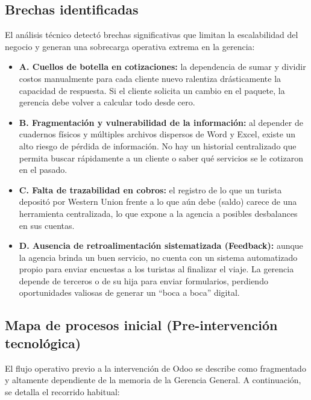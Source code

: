 \subsection{Brechas identificadas}
\begin{indentedsubsection}
El análisis técnico detectó brechas significativas que limitan la escalabilidad del negocio y generan una sobrecarga operativa extrema en la gerencia:

\begin{itemize}
    \item \textbf{A. Cuellos de botella en cotizaciones:} la dependencia de sumar y dividir costos manualmente para cada cliente nuevo ralentiza drásticamente la capacidad de respuesta. Si el cliente solicita un cambio en el paquete, la gerencia debe volver a calcular todo desde cero.
    \item \textbf{B. Fragmentación y vulnerabilidad de la información:} al depender de cuadernos físicos y múltiples archivos dispersos de Word y Excel, existe un alto riesgo de pérdida de información. No hay un historial centralizado que permita buscar rápidamente a un cliente o saber qué servicios se le cotizaron en el pasado.
    \item \textbf{C. Falta de trazabilidad en cobros:} el registro de lo que un turista depositó por Western Union frente a lo que aún debe (saldo) carece de una herramienta centralizada, lo que expone a la agencia a posibles desbalances en sus cuentas.
    \item \textbf{D. Ausencia de retroalimentación sistematizada (Feedback):} aunque la agencia brinda un buen servicio, no cuenta con un sistema automatizado propio para enviar encuestas a los turistas al finalizar el viaje. La gerencia depende de terceros o de su hija para enviar formularios, perdiendo oportunidades valiosas de generar un ``boca a boca'' digital.
\end{itemize}
\end{indentedsubsection}

\subsection{Mapa de procesos inicial (Pre-intervención tecnológica)}
\begin{indentedsubsection}
El flujo operativo previo a la intervención de Odoo se describe como fragmentado y altamente dependiente de la memoria de la Gerencia General. A continuación, se detalla el recorrido habitual:
\end{indentedsubsection}

